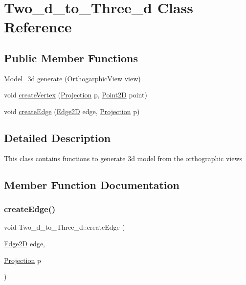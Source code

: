 \hypertarget{class_two__d__to___three__d}{}\section{Two\+\_\+d\+\_\+to\+\_\+\+Three\+\_\+d Class Reference}
\label{class_two__d__to___three__d}
\subsection*{Public Member Functions}
\begin{DoxyCompactItemize}
\item 
\hyperlink{class_model__3d}{Model\+\_\+3d} \hyperlink{class_two__d__to___three__d_ad9bd5587ebe1fc4e80ecc1587c2745ff}{generate} (Orthogarphic\+View view)
\item 
void \hyperlink{class_two__d__to___three__d_af07f101d864509449c07fafa196ece16}{create\+Vertex} (\hyperlink{class_projection}{Projection} p, \hyperlink{class_point2_d}{Point2D} point)
\item 
void \hyperlink{class_two__d__to___three__d_adcdb955dfea3b1398aeb67a70c23ec93}{create\+Edge} (\hyperlink{class_edge2_d}{Edge2D} edge, \hyperlink{class_projection}{Projection} p)
\end{DoxyCompactItemize}


\subsection{Detailed Description}
This class contains functions to generate 3d model from the orthographic views 

\subsection{Member Function Documentation}
\mbox{\label{class_two__d__to___three__d_adcdb955dfea3b1398aeb67a70c23ec93}} 
\subsubsection{\texorpdfstring{create\+Edge()}{createEdge()}}
{\footnotesize\ttfamily void Two\+\_\+d\+\_\+to\+\_\+\+Three\+\_\+d\+::create\+Edge (\begin{DoxyParamCaption}\item[{\hyperlink{class_edge2_d}{Edge2D}}]{edge,  }\item[{\hyperlink{class_projection}{Projection}}]{p }\end{DoxyParamCaption})}

